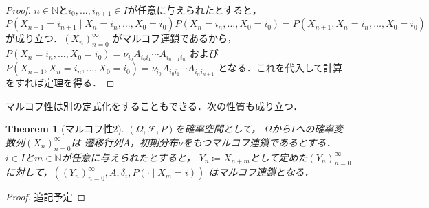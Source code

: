 \documentclass[dvipdfmx,autodetect-engine]{jsarticle}
\newtheorem{theorem}{Theorem}[section]
\theoremstyle{remark}
\theoremstyle{definition}
\newcommand{\N}{\mathbb{N}}
\begin{document}
\begin{proof}
    $n \in \N$と$i_0,\ldots,i_{n+1} \in I$が任意に与えられたとすると，
    $P(X_{n+1}=i_{n+1} \mid X_n = i_n,\ldots,X_0 = i_0)P(X_n = i_n,\ldots,X_0 = i_0) 
    = P(X_{n+1},X_n = i_n,\ldots,X_0 = i_0)$が成り立つ．$(X_n)_{n=0}^{\infty}$
    がマルコフ連鎖であるから，$P(X_n = i_n,\ldots,X_0 = i_0) = \nu_{i_0} A_{i_0 i_1} \cdots A_{i_{n-1} i_n}$
    および$P(X_{n+1},X_n = i_n,\ldots,X_0 = i_0) = \nu_{i_0} A_{i_0 i_1} \cdots A_{i_{n} i_{n+1}}$
    となる．これを代入して計算をすれば定理を得る．
\end{proof}

マルコフ性は別の定式化をすることもできる．次の性質も成り立つ．
\begin{theorem}[マルコフ性2]
    $(\Omega,\mathcal{F},P)$を確率空間として，
    $\Omega$から$I$への確率変数列$(X_n)_{n=0}^{\infty}$は
    遷移行列$A$，初期分布$\nu$をもつマルコフ連鎖であるとする．
    $i \in I$と$m \in \N$が任意に与えられたとすると，
    $Y_n \coloneqq X_{n+m}$として定めた$(Y_n)_{n=0}^{\infty}$
    に対して，$((Y_n)_{n=0}^{\infty},A,\delta_i, P(\cdot \mid X_m = i))$
    はマルコフ連鎖となる．
\end{theorem}

\begin{proof}
    追記予定
\end{proof}
\end{document}
